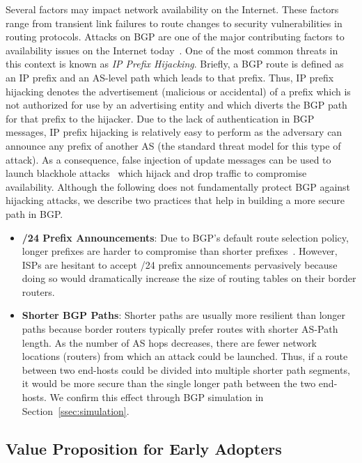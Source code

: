 Several factors may impact network availability on the Internet. These factors
range from transient link failures to route changes to security vulnerabilities
in routing protocols. Attacks on BGP are one of the major contributing factors
to availability issues on the Internet today~\cite{BGPVulnerabilities}.  One of
the most common threats in this context is known as \textit{IP Prefix
Hijacking}. Briefly, a BGP route is defined as an IP prefix and an AS-level
path which leads to that prefix. Thus, IP prefix hijacking denotes the
advertisement (malicious or accidental) of a prefix which is not authorized for
use by an advertising entity and which diverts the BGP path for that prefix to
the hijacker.  Due to the lack of authentication in BGP messages, IP prefix
hijacking is relatively easy to perform as the adversary can announce any
prefix of another AS (the standard threat model for this type of attack). As
a consequence, false injection of update messages can be used to launch
blackhole attacks~\cite{SPV2004} which hijack and drop traffic to compromise
availability.  Although the following does not fundamentally protect BGP
against hijacking attacks, we describe two practices that help in building a
more secure path in BGP.

\begin{itemize}
\setlength{\itemsep}{-3pt}

    \item{\textbf{/24 Prefix Announcements}}: Due to BGP's default route
selection policy, longer prefixes are harder to compromise than shorter
prefixes~\cite{conf/sp/HuM07,conf/sigcomm/BallaniFZ07}.  However, ISPs are
hesitant to accept /24 prefix announcements pervasively because doing so would
dramatically increase the size of routing tables on their border routers.

    \item{\textbf{Shorter BGP Paths}}: Shorter paths are usually more resilient
than longer paths because border routers typically prefer routes with shorter
AS-Path length. As the number of AS hops decreases, there are fewer network
locations (routers) from which an attack could be launched. Thus, if a route
between two end-hosts could be divided into multiple shorter path segments, it
would be more secure than the single longer path between the two end-hosts. We
confirm this effect through BGP simulation in Section~\ref{ssec:simulation}. 

\end{itemize}

\subsection{Value Proposition for Early Adopters}
\label{ssec:approach}
